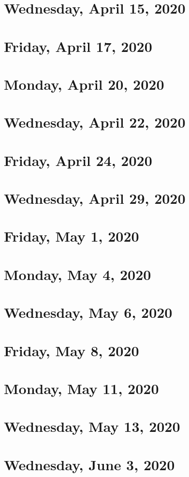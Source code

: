 \documentclass{../mynotes}
\begin{document}
\section{Wednesday, April 15, 2020}
    
\section{Friday, April 17, 2020}
    
    
\section{Monday, April 20, 2020}%
    
\section{Wednesday, April 22, 2020}
    
\section{Friday, April 24, 2020}
    

\section{Wednesday, April 29, 2020}
    
\section{Friday, May 1, 2020}
    

\section{Monday, May 4, 2020}
    
\section{Wednesday, May 6, 2020}
    
\section{Friday, May 8, 2020}
    

\section{Monday, May 11, 2020}
    
\section{Wednesday, May 13, 2020}
    

\section{Wednesday, June 3, 2020}
    
\end{document}
